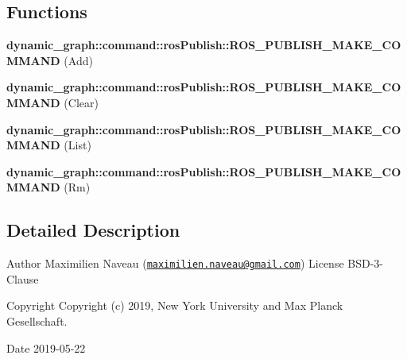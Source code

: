 \subsection*{Functions}
\begin{DoxyCompactItemize}
\item 
{\bfseries dynamic\+\_\+graph\+::command\+::ros\+Publish\+::\+R\+O\+S\+\_\+\+P\+U\+B\+L\+I\+S\+H\+\_\+\+M\+A\+K\+E\+\_\+\+C\+O\+M\+M\+A\+ND} (Add)\hypertarget{ros__publish_8hh_a6edff201bb1965b7e9e54641f6109434}{}\label{ros__publish_8hh_a6edff201bb1965b7e9e54641f6109434}

\item 
{\bfseries dynamic\+\_\+graph\+::command\+::ros\+Publish\+::\+R\+O\+S\+\_\+\+P\+U\+B\+L\+I\+S\+H\+\_\+\+M\+A\+K\+E\+\_\+\+C\+O\+M\+M\+A\+ND} (Clear)\hypertarget{ros__publish_8hh_a384348e4e418cc230ce5aff020e2c179}{}\label{ros__publish_8hh_a384348e4e418cc230ce5aff020e2c179}

\item 
{\bfseries dynamic\+\_\+graph\+::command\+::ros\+Publish\+::\+R\+O\+S\+\_\+\+P\+U\+B\+L\+I\+S\+H\+\_\+\+M\+A\+K\+E\+\_\+\+C\+O\+M\+M\+A\+ND} (List)\hypertarget{ros__publish_8hh_ae4e7c7511bb0cfbb523acf5fb2aac3b8}{}\label{ros__publish_8hh_ae4e7c7511bb0cfbb523acf5fb2aac3b8}

\item 
{\bfseries dynamic\+\_\+graph\+::command\+::ros\+Publish\+::\+R\+O\+S\+\_\+\+P\+U\+B\+L\+I\+S\+H\+\_\+\+M\+A\+K\+E\+\_\+\+C\+O\+M\+M\+A\+ND} (Rm)\hypertarget{ros__publish_8hh_a5ca28cb1740bdb17723412b5ce8d342c}{}\label{ros__publish_8hh_a5ca28cb1740bdb17723412b5ce8d342c}

\end{DoxyCompactItemize}


\subsection{Detailed Description}
\begin{DoxyAuthor}{Author}
Maximilien Naveau (\href{mailto:maximilien.naveau@gmail.com}{\tt maximilien.\+naveau@gmail.\+com})  License B\+S\+D-\/3-\/\+Clause 
\end{DoxyAuthor}
\begin{DoxyCopyright}{Copyright}
Copyright (c) 2019, New York University and Max Planck Gesellschaft. 
\end{DoxyCopyright}
\begin{DoxyDate}{Date}
2019-\/05-\/22 
\end{DoxyDate}


